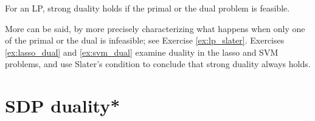 \begin{Corollary}
\label{cor:slater_lp}
For an LP, strong duality holds if the primal or the dual problem is 
feasible. 
\end{Corollary}

More can be said, by more precisely characterizing what happens when only one of
the primal or the dual is infeasible; see Exercise \ref{ex:lp_slater}. Exercises
\ref{ex:lasso_dual} and \ref{ex:svm_dual} examine duality in the lasso and SVM
problems, and use Slater's condition to conclude that strong duality always
holds.        

\section{SDP duality*}
\label{sec:sdp_duality}

